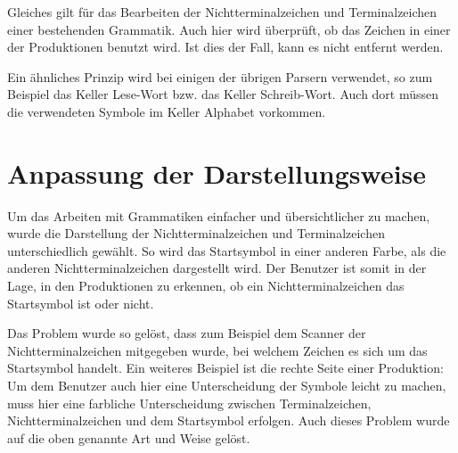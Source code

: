 Gleiches gilt für das Bearbeiten der Nichtterminalzeichen und Terminalzeichen
einer bestehenden Grammatik. Auch hier wird überprüft, ob das Zeichen in einer
der Produktionen benutzt wird. Ist dies der Fall, kann es nicht entfernt
werden.\vspace{10pt}

Ein ähnliches Prinzip wird bei einigen der übrigen Parsern verwendet, so zum
Beispiel das Keller Lese-Wort bzw. das Keller Schreib-Wort. Auch dort müssen
die verwendeten Symbole im Keller Alphabet vorkommen.\vspace{10pt}


\section{Anpassung der Darstellungsweise}\label{ParserAdaption}

Um das Arbeiten mit Grammatiken einfacher und übersichtlicher zu
machen, wurde die Darstellung der Nichtterminalzeichen und
Terminalzeichen unterschiedlich gewählt. So wird das Startsymbol in einer
anderen Farbe, als die anderen Nichtterminalzeichen dargestellt wird. Der
Benutzer ist somit in der Lage, in den Produktionen zu erkennen, ob ein
Nichtterminalzeichen das Startsymbol ist oder nicht.\vspace{10pt}

Das Problem wurde so gelöst, dass zum Beispiel dem Scanner der
Nichtterminalzeichen mitgegeben wurde, bei welchem Zeichen es sich um das
Startsymbol handelt. Ein weiteres Beispiel ist die rechte Seite einer
Produktion: Um dem Benutzer auch hier eine Unterscheidung der Symbole leicht zu
machen, muss hier eine farbliche Unterscheidung zwischen Terminalzeichen,
Nichtterminalzeichen und dem Startsymbol erfolgen. Auch dieses Problem wurde auf
die oben genannte Art und Weise gelöst.\vspace{10pt}


